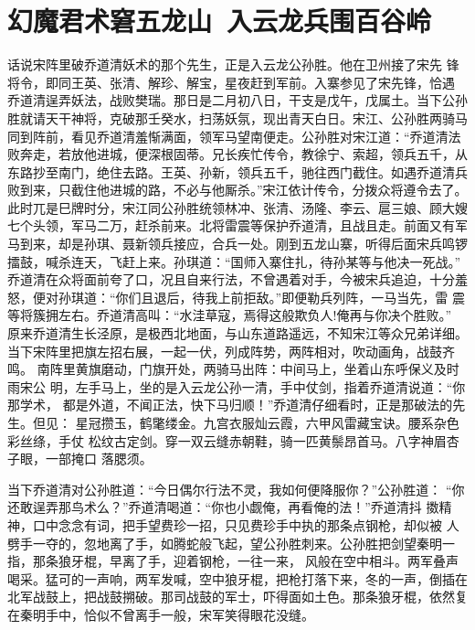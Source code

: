 \chapter{幻魔君术窘五龙山~入云龙兵围百谷岭}

话说宋阵里破乔道清妖术的那个先生，正是入云龙公孙胜。他在卫州接了宋先
锋将令，即同王英、张清、解珍、解宝，星夜赶到军前。入寨参见了宋先锋，恰遇
乔道清逞弄妖法，战败樊瑞。那日是二月初八日，干支是戊午，戊属土。当下公孙
胜就请天干神将，克破那壬癸水，扫荡妖氛，现出青天白日。宋江、公孙胜两骑马
同到阵前，看见乔道清羞惭满面，领军马望南便走。公孙胜对宋江道：“乔道清法
败奔走，若放他进城，便深根固蒂。兄长疾忙传令，教徐宁、索超，领兵五千，从
东路抄至南门，绝住去路。王英、孙新，领兵五千，驰往西门截住。如遇乔道清兵
败到来，只截住他进城的路，不必与他厮杀。”宋江依计传令，分拨众将遵令去了。
此时兀是巳牌时分，宋江同公孙胜统领林冲、张清、汤隆、李云、扈三娘、顾大嫂
七个头领，军马二万，赶杀前来。北将雷震等保护乔道清，且战且走。前面又有军
马到来，却是孙琪、聂新领兵接应，合兵一处。刚到五龙山寨，听得后面宋兵鸣锣
擂鼓，喊杀连天，飞赶上来。孙琪道：“国师入寨住扎，待孙某等与他决一死战。”
乔道清在众将面前夸了口，况且自来行法，不曾遇着对手，今被宋兵追迫，十分羞
怒，便对孙琪道：“你们且退后，待我上前拒敌。”即便勒兵列阵，一马当先，雷
震等将簇拥左右。乔道清高叫：“水洼草寇，焉得这般欺负人!俺再与你决个胜败。”
原来乔道清生长泾原，是极西北地面，与山东道路遥远，不知宋江等众兄弟详细。
当下宋阵里把旗左招右展，一起一伏，列成阵势，两阵相对，吹动画角，战鼓齐鸣。
南阵里黄旗磨动，门旗开处，两骑马出阵：中间马上，坐着山东呼保义及时雨宋公
明，左手马上，坐的是入云龙公孙一清，手中仗剑，指着乔道清说道：“你那学术，
都是外道，不闻正法，快下马归顺！”乔道清仔细看时，正是那破法的先生。但见：
星冠攒玉，鹤氅缕金。九宫衣服灿云霞，六甲风雷藏宝诀。腰系杂色彩丝绦，手仗
松纹古定剑。穿一双云缝赤朝鞋，骑一匹黄鬃昂首马。八字神眉杏子眼，一部掩口
落腮须。

当下乔道清对公孙胜道：“今日偶尔行法不灵，我如何便降服你？”公孙胜道：
“你还敢逞弄那鸟术么？”乔道清喝道：“你也小觑俺，再看俺的法！”乔道清抖
擞精神，口中念念有词，把手望费珍一招，只见费珍手中执的那条点钢枪，却似被
人劈手一夺的，忽地离了手，如腾蛇般飞起，望公孙胜刺来。公孙胜把剑望秦明一
指，那条狼牙棍，早离了手，迎着钢枪，一往一来，风般在空中相斗。两军叠声
喝采。猛可的一声响，两军发喊，空中狼牙棍，把枪打落下来，冬的一声，倒插在
北军战鼓上，把战鼓搠破。那司战鼓的军士，吓得面如土色。那条狼牙棍，依然复
在秦明手中，恰似不曾离手一般，宋军笑得眼花没缝。

